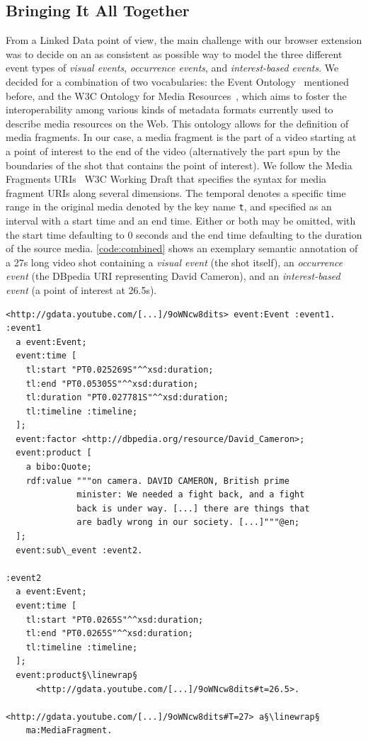 \documentclass[runningheads,a4paper]{llncs}
\newcommand{\linewrap}{\raisebox{-.6ex}{\textcolor{grey}{$\hookleftarrow$}}}
\begin{document}
\subsection{Bringing It All Together}
From a Linked Data point of view, the main challenge with our browser extension was to decide on an as consistent as possible way to model the three different event types of \emph{visual events}, \emph{occurrence events}, and \emph{interest-based events}. We decided for a combination of two vocabularies: the Event Ontology~\cite{Raimond:Event} mentioned before, and the W3C Ontology for Media Resources~\cite{mediaontology}, which aims to foster the interoperability among various kinds of metadata formats currently used to describe media resources on the Web. This ontology allows for the definition of media fragments. In our case, a media fragment is the part of a video starting at a point of interest to the end of the video (alternatively the part spun by the boundaries of the shot that contains the point of interest). We follow the Media Fragments URIs~\cite{W3C:MediaFrags} W3C Working Draft that specifies the syntax for media fragment URIs along several dimensions. The temporal denotes a specific time range in the original media denoted by the key name \texttt{t}, and specified as an interval with a start time and an end time. Either or both may be omitted, with the start time defaulting to 0 seconds and the end time defaulting to the duration of the source media. \autoref{code:combined} shows an exemplary semantic annotation of a 27s long video shot containing a \emph{visual event} (the shot itself), an \emph{occurrence event} (the DBpedia URI representing David Cameron), and an \emph{interest-based event} (a point of interest at 26.5s). 

\begin{lstlisting}[caption=Semantic annotation of a 27s long video shot showing David Cameron talk about the London riots (\texttt{:event1}). A point of interest generated by a YouTube user (\texttt{:event2} that is modeled as a sub event of \texttt{:event1}) is defined at 26.5s in the video where Cameron starts to appear., label=code:combined, float=htb!, escapechar=§]
<http://gdata.youtube.com/[...]/9oWNcw8dits> event:Event :event1.
:event1
  a event:Event;
  event:time [
    tl:start "PT0.025269S"^^xsd:duration;
    tl:end "PT0.05305S"^^xsd:duration;
    tl:duration "PT0.027781S"^^xsd:duration;
    tl:timeline :timeline;
  ];
  event:factor <http://dbpedia.org/resource/David_Cameron>;
  event:product [
    a bibo:Quote;
    rdf:value """on camera. DAVID CAMERON, British prime
              minister: We needed a fight back, and a fight
              back is under way. [...] there are things that
              are badly wrong in our society. [...]"""@en;
  ];
  event:sub\_event :event2.
  
:event2
  a event:Event;
  event:time [
    tl:start "PT0.0265S"^^xsd:duration;
    tl:end "PT0.0265S"^^xsd:duration;
    tl:timeline :timeline;
  ];  
  event:product§\linewrap§
      <http://gdata.youtube.com/[...]/9oWNcw8dits#t=26.5>.
  
<http://gdata.youtube.com/[...]/9oWNcw8dits#T=27> a§\linewrap§
    ma:MediaFragment.
\end{lstlisting} 
\end{document}
